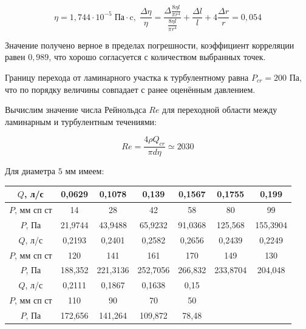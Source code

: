 \documentclass[a4paper, 12pt]{article} %
\begin{document}
\begin{equation}
    \eta = 1,744 \cdot 10^{-5} \; \text{Па} \cdot \text{c}, \; \frac{\Delta \eta}{\eta} = \frac{\Delta \frac{8\eta l}{\pi r^4}}{\frac{8\eta l}{\pi r^4}} +  \frac{\Delta l}{l} + 4 \frac{\Delta r}{r} = 0,054
\end{equation}

Значение получено верное в пределах погрешности, коэффициент корреляции равен $0,989$, что хорошо согласуется с количеством выбранных точек.

Границу перехода от ламинарного участка к турбулентному равна $P_{cr} = 200$ Па, что по порядку величины совпадает с ранее оценённым давлением.

Вычислим значение числа Рейнольдса $Re$ для переходной области между ламинарным и турбулентным течениями:

\begin{equation}
    Re = \frac{4 \rho Q_{cr}}{\pi d \eta} \simeq 2030
\end{equation}

Для диаметра $5$ мм имеем:

\begin{table}[!h]
\begin{tabular}{|c|c|c|c|c|c|c|}
\hline
$Q$, л/с      & 0,0629  & 0,1078   & 0,139    & 0,1567  & 0,1755                & 0,199                 \\ \hline
$P$, мм сп ст & 14      & 28       & 42       & 58      & 80                    & 99                    \\ \hline
$P$, Па       & 21,9744 & 43,9488  & 65,9232  & 91,0368 & 125,568               & 155,3904              \\ \hline
$Q$, л/с      & 0,2193  & 0,2401   & 0,2582   & 0,2656  & 0,2439                & 0,2249                \\ \hline
$P$, мм сп ст & 120     & 141      & 161      & 170     & 149                   & 130                   \\ \hline
$P$, Па       & 188,352 & 221,3136 & 252,7056 & 266,832 & 233,8704              & 204,048               \\ \hline
$Q$, л/с      & 0,2111  & 0,1867   & 0,1638   & 0,15    & \multicolumn{1}{l|}{} & \multicolumn{1}{l|}{} \\ \hline
$P$, мм сп ст & 110     & 90       & 70       & 50      & \multicolumn{1}{l|}{} & \multicolumn{1}{l|}{} \\ \hline
$P$, Па       & 172,656 & 141,264  & 109,872  & 78,48   & \multicolumn{1}{l|}{} & \multicolumn{1}{l|}{} \\ \hline
\end{tabular}
\end{table}
\end{document}
